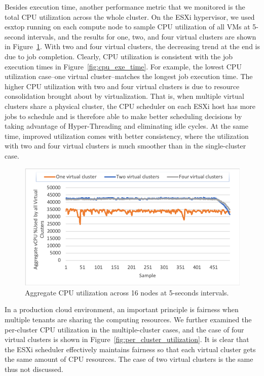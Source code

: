 Besides execution time, another performance metric that we monitored is the total CPU utilization across the whole cluster. On the ESXi hypervisor, we used esxtop running on each compute node to sample CPU utilization of all VMs at 5-second intervals, and the results for one, two, and four virtual clusters are shown in Figure~\ref{fig:cpu_utilizations}. With two and four virtual clusters, the decreasing trend at the end is due to job completion. Clearly, CPU utilization is consistent with the job execution times in Figure~\ref{fig:cpu_exe_time}. For example, the lowest CPU utilization case--one virtual cluster--matches the longest job execution time. The higher CPU utilization with two and four virtual clusters is due to resource consolidation brought about by virtualization. That is, when multiple virtual clusters share a physical cluster, the CPU scheduler on each ESXi host has more jobs to schedule and is therefore able to make better scheduling decisions by taking advantage of Hyper-Threading and eliminating idle cycles. At the same time, improved utilization comes with better consistency, where the utilization with two and four virtual clusters is much smoother than in the single-cluster case.

\begin{figure}[!t]
   \begin{center}
       \includegraphics[width=\columnwidth]{Figures/cpu_utilizations}
   \end{center}
   \caption{Aggregate CPU utilization across 16 nodes at 5-seconds intervals.}
   \label{fig:cpu_utilizations}
   \vspace{-0.2in}
 \end{figure}

 In a production cloud environment, an important principle is fairness when multiple tenants are sharing the computing resources. We further examined the per-cluster CPU utilization in the multiple-cluster cases, and the case of four virtual clusters is shown in Figure~\ref{fig:per_cluster_utilization}. It is clear that the ESXi scheduler effectively maintains fairness so that each virtual cluster gets the same amount of CPU resources. The case of two virtual clusters is 
 the same thus not discussed. 


